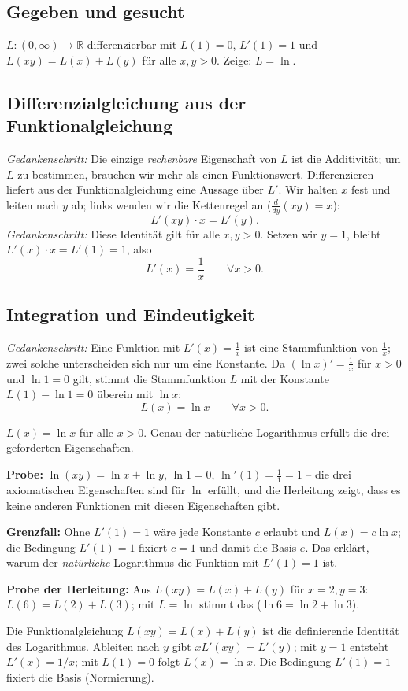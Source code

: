 
\subsection*{Gegeben und gesucht}
$L\colon(0,\infty)\to\mathbb R$ differenzierbar mit $L(1)=0$, $L'(1)=1$
und $L(xy)=L(x)+L(y)$ für alle $x,y>0$. Zeige: $L=\ln$.

\subsection*{Differenzialgleichung aus der Funktionalgleichung}
\emph{Gedankenschritt:} Die einzige \emph{rechenbare} Eigenschaft von $L$ ist
die Additivität; um $L$ zu bestimmen, brauchen wir mehr als einen
Funktionswert. Differenzieren liefert aus der Funktionalgleichung eine
Aussage über $L'$. Wir halten $x$ fest und leiten nach $y$ ab;
links wenden wir die Kettenregel an ($\frac d{dy}(xy)=x$):
\begin{equation*}
  L'(xy)\cdot x=L'(y).
\end{equation*}
\emph{Gedankenschritt:} Diese Identität gilt für alle $x,y>0$. Setzen wir
$y=1$, bleibt $L'(x)\cdot x=L'(1)=1$, also
\begin{equation*}
  L'(x)=\frac1x\qquad\forall x>0.
\end{equation*}

\subsection*{Integration und Eindeutigkeit}
\emph{Gedankenschritt:} Eine Funktion mit $L'(x)=\frac1x$ ist eine
Stammfunktion von $\frac1x$; zwei solche unterscheiden sich nur um eine
Konstante. Da $(\ln x)'=\frac1x$ für $x>0$ und $\ln 1=0$ gilt, stimmt die
Stammfunktion $L$ mit der Konstante $L(1)-\ln 1=0$ überein mit $\ln x$:
\begin{equation*}
  L(x)=\ln x\qquad\forall x>0.
\end{equation*}

\begin{ergebnis}
$L(x)=\ln x$ für alle $x>0$. Genau der natürliche Logarithmus erfüllt die
drei geforderten Eigenschaften.
\end{ergebnis}

\begin{kontrolle}
\textbf{Probe:} $\ln(xy)=\ln x+\ln y$, $\ln 1=0$, $\ln'(1)=\frac11=1$ --
die drei axiomatischen Eigenschaften sind für $\ln$ erfüllt, und die
Herleitung zeigt, dass es keine anderen Funktionen mit diesen
Eigenschaften gibt. \checkmark

\textbf{Grenzfall:} Ohne $L'(1)=1$ wäre jede Konstante $c$ erlaubt und
$L(x)=c\ln x$; die Bedingung $L'(1)=1$ fixiert $c=1$ und damit die Basis
$e$. Das erklärt, warum der \emph{natürliche} Logarithmus die Funktion mit
$L'(1)=1$ ist. \checkmark

\textbf{Probe der Herleitung:} Aus $L(xy)=L(x)+L(y)$ für $x=2,y=3$:
$L(6)=L(2)+L(3)$; mit $L=\ln$ stimmt das ($\ln6=\ln2+\ln3$). \checkmark
\end{kontrolle}

\begin{merksatz}
Die Funktionalgleichung $L(xy)=L(x)+L(y)$ ist die definierende Identität
des Logarithmus. Ableiten nach $y$ gibt $xL'(xy)=L'(y)$; mit $y=1$
entsteht $L'(x)=1/x$; mit $L(1)=0$ folgt $L(x)=\ln x$. Die Bedingung
$L'(1)=1$ fixiert die Basis (Normierung).
\end{merksatz}

